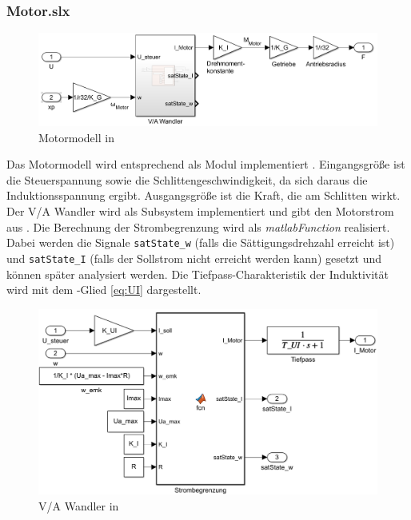 \subsubsection{Motor.slx}
\begin{figure}[h]
	\centering
		\includegraphics[scale=0.4]{Bilder/Simulink/motor.PNG}
	\caption{Motormodell in \sm}
	\label{fig:simmot}
\end{figure}
Das Motormodell wird  entsprechend als Modul implementiert .
Eingangsgröße ist die Steuerspannung sowie die Schlittengeschwindigkeit, da sich daraus die Induktionsspannung ergibt.
Ausgangsgröße ist die Kraft, die am Schlitten wirkt.
Der V/A Wandler wird als Subsystem implementiert und gibt den Motorstrom aus .
Die Berechnung der Strombegrenzung  wird als \emph{matlabFunction} realisiert.
Dabei werden die Signale \texttt{satState\_w} (falls die Sättigungsdrehzahl erreicht ist) und \texttt{satState\_I} (falls der Sollstrom nicht erreicht werden kann) gesetzt und können später analysiert werden.
Die Tiefpass-Charakteristik der Induktivität wird mit dem -Glied \eqref{eq:UI} dargestellt.


\begin{figure}
	\centering
		\includegraphics[scale=0.4]{Bilder/Simulink/va_wandler.PNG}
	\caption{V/A Wandler in \sm}
	\label{fig:simva}
\end{figure}

